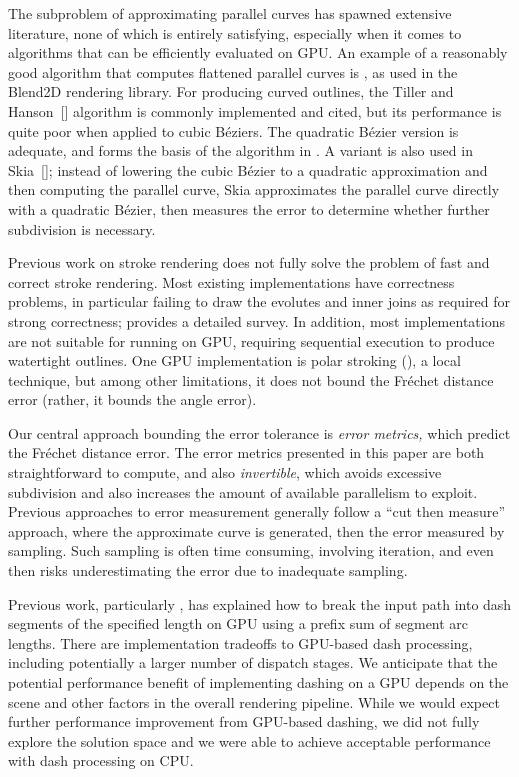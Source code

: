 \documentclass[sigconf, nonacm]{acmart}
\begin{document}
The subproblem of approximating parallel curves has spawned extensive literature, none of which is entirely satisfying, especially when it comes to algorithms that can be efficiently evaluated on GPU. An example of a reasonably good algorithm that computes flattened parallel curves is \citet{Yzerman2020}, as used in the Blend2D rendering library. For producing curved outlines, the Tiller and Hanson~[] algorithm is commonly implemented and cited, but its performance is quite poor when applied to cubic Béziers. The quadratic Bézier version is adequate, and forms the basis of the algorithm in \citet{Nehab2020}. A variant is also used in Skia~[]; instead of lowering the cubic Bézier to a quadratic approximation and then computing the parallel curve, Skia approximates the parallel curve directly with a quadratic Bézier, then measures the error to determine whether further subdivision is necessary.

Previous work on stroke rendering does not fully solve the problem of fast and correct stroke rendering. Most existing implementations have correctness problems, in particular failing to draw the evolutes and inner joins as required for strong correctness; \citet{Nehab2020} provides a detailed survey. In addition, most implementations are not suitable for running on GPU, requiring sequential execution to produce watertight outlines. One GPU implementation is polar stroking (\citet{Kilgard2020}), a local technique, but among other limitations, it does not bound the Fréchet distance error (rather, it bounds the angle error).

Our central approach bounding the error tolerance is \emph{error metrics,} which predict the Fréchet distance error. The error metrics presented in this paper are both straightforward to compute, and also \emph{invertible}, which avoids excessive subdivision and also increases the amount of available parallelism to exploit. Previous approaches to error measurement generally follow a ``cut then measure'' approach, where the approximate curve is generated, then the error measured by sampling. Such sampling is often time consuming, involving iteration, and even then risks underestimating the error due to inadequate sampling.

Previous work, particularly \citet{Kilgard2020}, has explained how to break the input path into dash segments of the specified length on GPU using a prefix sum of segment arc lengths. There are implementation tradeoffs to GPU-based dash processing, including potentially a larger number of dispatch stages. We anticipate that the potential performance benefit of implementing dashing on a GPU depends on the scene and other factors in the overall rendering pipeline. While we would expect further performance improvement from GPU-based dashing, we did not fully explore the solution space and we were able to achieve acceptable performance with dash processing on CPU.
\end{document}
